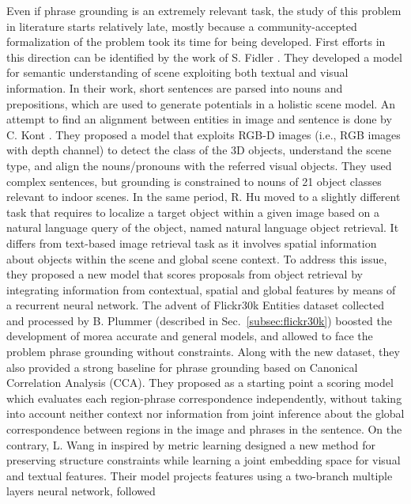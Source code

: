 Even if phrase grounding is an extremely relevant task, the study of
this problem in literature starts relatively late, mostly because a
community-accepted formalization of the problem took its time for
being developed. First efforts in this direction can be identified by
the work of S. Fidler \etal{} \cite{fidler2013sentence}. They
developed a model for semantic understanding of scene exploiting both
textual and visual information. In their work, short sentences are
parsed into nouns and prepositions, which are used to generate
potentials in a holistic scene model. An attempt to find an alignment
between entities in image and sentence is done by C. Kont \etal{}
\cite{kong2014you}. They proposed a model that exploits RGB-D images
(i.e., RGB images with depth channel) to detect the class of the 3D
objects, understand the scene type, and align the nouns/pronouns with
the referred visual objects. They used complex sentences, but
grounding is constrained to nouns of 21 object classes relevant to
indoor scenes. In the same period, R. Hu \etal{} \cite{hu2016natural}
moved to a slightly different task that requires to localize a target
object within a given image based on a natural language query of the
object, named natural language object retrieval. It differs from
text-based image retrieval task as it involves spatial information
about objects within the scene and global scene context. To address
this issue, they proposed a new model that scores proposals from
object retrieval by integrating information from contextual, spatial
and global features by means of a recurrent neural network. The advent
of Flickr30k Entities dataset collected and processed by B. Plummer
\etal{} \cite{plummer2015flickr30k} (described in
Sec.~\ref{subsec:flickr30k}) boosted the development of morea accurate
and general models, and allowed to face the problem phrase grounding
without constraints. Along with the new dataset, they also provided a
strong baseline for phrase grounding based on Canonical Correlation
Analysis (CCA). They proposed as a starting point a scoring model
which evaluates each region-phrase correspondence independently,
without taking into account neither context nor information from joint
inference about the global correspondence between regions in the image
and phrases in the sentence. On the contrary, L. Wang \etal{} in
\cite{wang2016learning} inspired by metric learning designed a new
method for preserving structure constraints while learning a joint
embedding space for visual and textual features. Their model projects
features using a two-branch multiple layers neural network, followed
